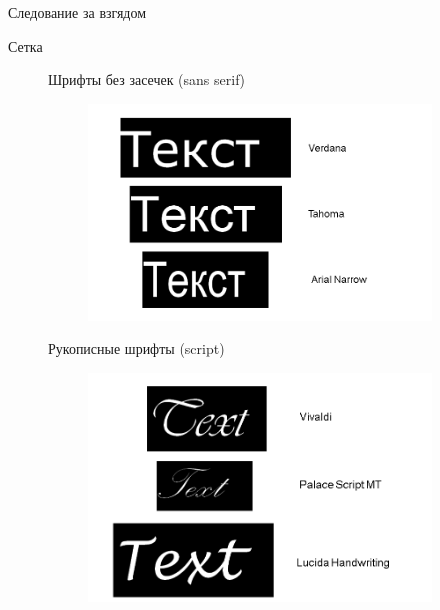 \documentclass{beamer}
\begin{document}
\begin{frame}[t]{Следование за взгядом}
\begin{frame}[t]{Сетка}
\begin{figure}[h]
\begin{frame}[t]{Шрифты без засечек (sans serif)}
	\begin{figure}[h]
		\centering
		\includegraphics[scale=0.5]{images/lec05-pic08.png}
	\end{figure}
\end{frame}  

\begin{frame}[t]{Рукописные шрифты (script)}
	\begin{figure}[h]
		\centering
		\includegraphics[scale=0.5]{images/lec05-pic09.png}
	\end{figure}
\end{frame}  


\end{figure}
\end{frame}
\end{frame}
\end{document}
